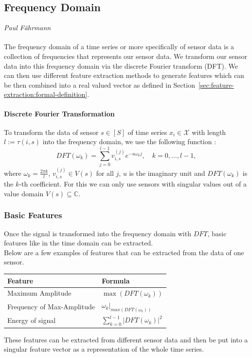 \subsection{Frequency Domain}
\vspace*{-15mm}
\hfill{\normalsize\emph{Paul Fährmann}}
\label{sec:feature-extraction:approaches:frequency-domain}
\\\\
The frequency domain of a time series or more specifically of sensor data is a collection of frequencies that represents our sensor data. We transform our sensor data into this frequency domain via the discrete Fourier transform (DFT). We can then use different feature extraction methods to generate features which can be then combined into a real valued vector as defined in Section~\ref{sec:feature-extraction:formal-definition}.
\paragraph{Discrete Fourier Transformation}
To transform the data of sensor $s \in [S]$ of time series $x_{i}\in\mathcal{X}$ with length $l := \tau(i,s)$ into the frequency domain, we use the following function \cite{DBLP:phd/dnb/Kimotho16}:
\begin{equation}
DFT(\omega_k)=\sum\limits_{j=0}^{l-1} v_{i,s}^{(j)} e^{-u\omega_kj},\quad k = 0,\dots,l-1,
\end{equation}
where $\omega_k = \frac{2\pi k}{l}$, $v_{i,s}^{(j)} \in V(s)$ for all $j$, $u$ is the imaginary unit and $DFT(\omega_k)$ is the $k$-th coefficient. For this we can only use sensors with singular values out of a value domain  $V(s)\subseteq\mathbb{C}$.
\subsubsection{Basic Features}
Once the signal is transformed into the frequency domain with $DFT$, basic features like in the time domain can be extracted.\\
Below are a few examples \cite{DBLP:phd/dnb/Kimotho16} of features that can be extracted from the data of one sensor.
\begin{center}
	\begin{tabularx}{.625\textwidth}{ll}
		\hline
		Feature & Formula\\
		\hline
		Maximum Amplitude & $\max(DFT(\omega_k))$\\
		Frequency of Max-Amplitude & $\omega_k|_{max(DFT(\omega_k))}$\\
		Energy of signal & $\sum_{k=0}^{l-1}|DFT(\omega_k)|^2$\\
		\hline
	\end{tabularx}
\end{center}
These features can be extracted from different sensor data and then be put into a singular feature vector as a representation of the whole time series.
